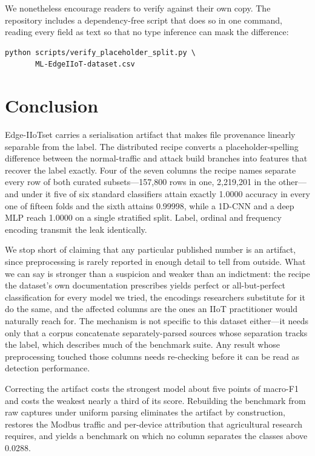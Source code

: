 We nonetheless encourage readers to verify against their own copy. The
repository includes a dependency-free script that does so in one command,
reading every field as text so that no type inference can mask the difference:

\begin{verbatim}
python scripts/verify_placeholder_split.py \
       ML-EdgeIIoT-dataset.csv
\end{verbatim}

\section{Conclusion}

Edge-IIoTset carries a serialisation artifact that makes file provenance
linearly separable from the label. The distributed recipe converts a
placeholder-spelling difference between the normal-traffic and attack build
branches into features that recover the label exactly. Four of the seven
columns the recipe names separate every row of both curated
subsets---157{,}800 rows in one, 2{,}219{,}201 in the other---and under it five
of six standard classifiers attain exactly 1.0000 accuracy in every one of
fifteen folds and the sixth attains 0.99998, while a 1D-CNN and a deep MLP
reach 1.0000 on a single stratified split. Label, ordinal and frequency
encoding transmit the leak identically.

We stop short of claiming that any particular published number is an artifact,
since preprocessing is rarely reported in enough detail to tell from outside.
What we can say is stronger than a suspicion and weaker than an indictment: the
recipe the dataset's own documentation prescribes yields perfect or
all-but-perfect classification for every model we tried, the encodings
researchers substitute for it do the same, and the affected columns are the
ones an IIoT practitioner would naturally reach for. The mechanism is not
specific to this dataset either---it needs only that a corpus concatenate
separately-parsed sources whose separation tracks the label, which describes
much of the benchmark suite. Any result whose preprocessing touched those
columns needs re-checking before it can be read as detection performance.

Correcting the artifact costs the strongest model about five points of macro-F1
and costs the weakest nearly a third of its score. Rebuilding the benchmark
from raw captures under uniform parsing eliminates the artifact by
construction, restores the Modbus traffic and per-device attribution that
agricultural research requires, and yields a benchmark on which no column
separates the classes above 0.0288.

